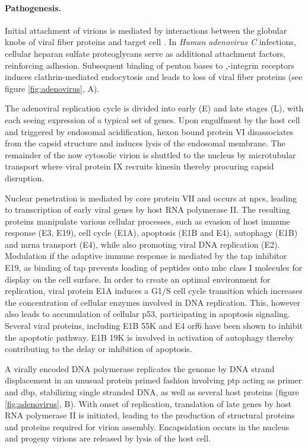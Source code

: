 \paragraph{Pathogenesis.}
Initial attachment of virions is mediated by interactions between the globular knobs of viral fiber proteins and target cell . In \textit{Human adenovirus C} infections, cellular heparan sulfate proteoglycans serve as additional attachment factors, reinforcing adhesion. Subsequent binding of penton bases to \textalpha,\textbeta-integrin receptors induces clathrin-mediated endocytosis and leads to loss of viral fiber proteins (see figure \ref{fig:adenovirus}, A).

The adenoviral replication cycle is divided into early (E) and late stages (L), with each seeing expression of a typical set of genes. Upon engulfment by the host cell and triggered by endosomal acidification, hexon bound protein VI disassociates from the capsid structure and induces lysis of the endosomal membrane. The remainder of the now cytosolic virion is shuttled to the nucleus by microtubular transport where viral protein IX recruits kinesin thereby procuring capsid disruption.

Nuclear penetration is mediated by core protein VII and occurs at \glspl{npc}, leading to transcription of early viral genes by host RNA polymerase II. The resulting proteins manipulate various cellular processes, such as evasion of host immune response (E3, E19), cell cycle (E1A), apoptosis (E1B and E4), autophagy (E1B) and \gls{mrna} transport (E4), while also promoting viral DNA replication (E2). Modulation if the adaptive immune response is mediated by the \gls{tap} inhibitor E19, as binding of \gls{tap} prevents loading of peptides onto \gls{mhc} class I molecules for display on the cell surface. In order to create an optimal environment for replication, viral protein E1A induces a G1/S cell cycle transition which increases the concentration of cellular enzymes involved in DNA replication. This, however also leads to accumulation of cellular p53, participating in apoptosis signaling. Several viral proteins, including E1B 55K and E4 orf6 have been shown to inhibit the apoptotic pathway. E1B 19K is involved in activation of autophagy thereby contributing to the delay or inhibition of apoptosis.

A virally encoded DNA polymerase replicates the genome by DNA strand displacement in an unusual protein primed fashion involving \gls{ptp} acting as primer and \gls{dbp}, stabilizing single stranded DNA, as well as several host proteins (figure \ref{fig:adenovirus}, B). With onset of replication, translation of late genes by host RNA polymerase II is initiated, leading to the production of structural proteins and proteins required for virion assembly. Encapsidation occurs in the nucleus and progeny virions are released by lysis of the host cell.

